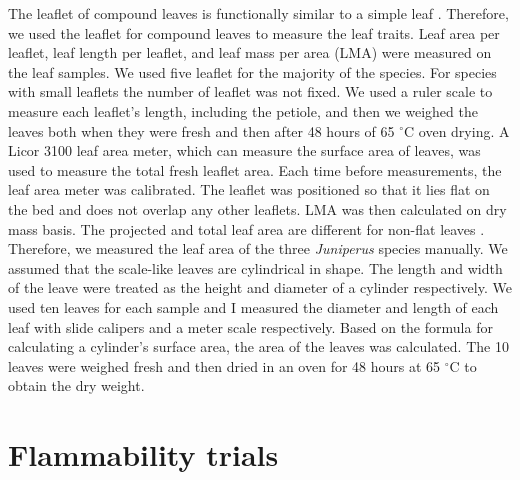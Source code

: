 \documentclass{ttuthes2007}
\begin{document}
\noindent The leaflet of compound leaves is functionally similar to a simple leaf \citep{perez2016corrigendum}. Therefore, we used the leaflet for compound leaves to measure the leaf traits. Leaf area per leaflet, leaf length per leaflet, and leaf mass per area (LMA) were measured on the leaf samples. We used five leaflet for the majority of the species. For species with small leaflets the number of leaflet was not fixed.
We used a ruler scale to measure each leaflet's length, including the petiole, and then we weighed the leaves both when they were fresh and then after 48 hours of 65 $^{\circ}$C oven drying. A Licor 3100 leaf area meter, which can measure the surface area of leaves, was used to measure the total fresh leaflet area. Each time before measurements, the leaf area meter was calibrated. The leaflet was positioned so that it lies flat on the bed and does not overlap any other leaflets.   %
LMA was then calculated on  dry mass basis. The projected and total leaf area are different for non-flat leaves \citep{perez2016corrigendum, cornelissen2003handbook}. Therefore, we measured the leaf area of the three \emph{Juniperus} species manually. We assumed that the scale-like leaves
are cylindrical in shape. The length and width of the leave were treated as the height and diameter of a cylinder respectively. We used ten leaves for each sample and I measured the diameter and length of each leaf with slide calipers and a meter scale respectively. Based on the formula for calculating a cylinder's surface area, the area of the leaves was calculated. The 10 leaves were weighed fresh and then dried in an oven for 48 hours at 65 $^{\circ}$C to obtain the dry weight.


\section*{\textbf{Flammability trials}}
\end{document}
